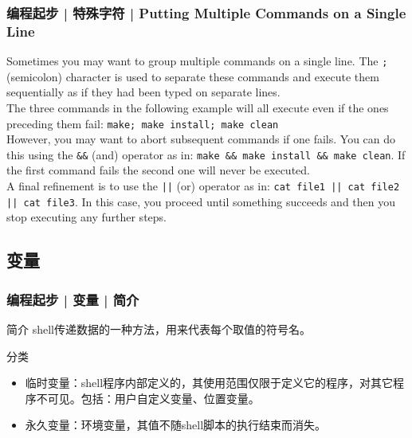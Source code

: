 \begin{frame}[fragile]
  \frametitle{编程起步 | 特殊字符 | Putting Multiple Commands on a Single Line}
  Sometimes you may want to group multiple commands on a single line. The \verb|;| (semicolon) character is used to separate these commands and execute them sequentially as if they had been typed on separate lines.\\
  \vspace{0.2cm}
  The three commands in the following example will all execute even if the ones preceding them fail: \verb|make; make install; make clean|\\
  \vspace{0.2cm}
  However, you may want to abort subsequent commands if one fails. You can do this using the \verb|&&| (and) operator as in: \verb|make && make install && make clean|. If the first command fails the second one will never be executed.\\
  \vspace{0.2cm}
  A final refinement is to use the \verb=||= (or) operator as in: \verb=cat file1 || cat file2 || cat file3=. In this case, you proceed until something succeeds and then you stop executing any further steps.
\end{frame}

\subsection{变量}
\begin{frame}
  \frametitle{编程起步 | 变量 | 简介}
  \begin{block}{简介}
    shell传递数据的一种方法，用来代表每个取值的符号名。
  \end{block}
  \pause
  \begin{block}{分类}
    \begin{itemize}
      \item 临时变量：shell程序内部定义的，其使用范围仅限于定义它的程序，对其它程序不可见。包括：用户自定义变量、位置变量。
      \item 永久变量：环境变量，其值不随shell脚本的执行结束而消失。
    \end{itemize}
  \end{block}
\end{frame}

